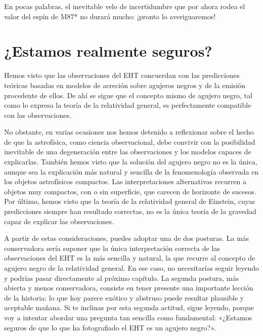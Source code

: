 En pocas palabras, el inevitable velo de incertidumbre que por ahora rodea el valor del espín de M87* no durará mucho: ¡pronto lo averiguaremos!

\section{¿Estamos realmente seguros?}\label{sec:07-sure}

Hemos visto que las observaciones del EHT concuerdan con las predicciones teóricas basadas en modelos de acreción sobre agujeros negros y de la emisión procedente de ellos. De ahí se sigue que el concepto mismo de agujero negro, tal como lo expresa la teoría de la relatividad general, es perfectamente compatible con las observaciones.

No obstante, en varias ocasiones nos hemos detenido a reflexionar sobre el hecho de que la astrofísica, como ciencia observacional, debe convivir con la posibilidad inevitable de una degeneración entre las observaciones y los modelos capaces de explicarlas. También hemos visto que la solución del agujero negro no es la única, aunque sea la explicación más natural y sencilla de la fenomenología observada en los objetos astrofísicos compactos. Las interpretaciones alternativas recurren a objetos muy compactos, con o sin superficie, que carecen de horizonte de sucesos. Por último, hemos visto que la teoría de la relatividad general de Einstein, cuyas predicciones siempre han resultado correctas, no es la única teoría de la gravedad capaz de explicar las observaciones.

A partir de estas consideraciones, puedes adoptar una de dos posturas. La más conservadora sería suponer que la única interpretación correcta de las observaciones del EHT es la más sencilla y natural, la que recurre al concepto de agujero negro de la relatividad general. En ese caso, no necesitarías seguir leyendo y podrías pasar directamente al próximo capítulo. La segunda postura, más abierta y menos conservadora, consiste en tener presente una importante lección de la historia: lo que hoy parece exótico y abstruso puede resultar plausible y aceptable mañana. Si te inclinas por esta segunda actitud, sigue leyendo, porque voy a intentar abordar una pregunta tan sencilla como fundamental: «¿Estamos seguros de que lo que ha fotografiado el EHT es un agujero negro?».

